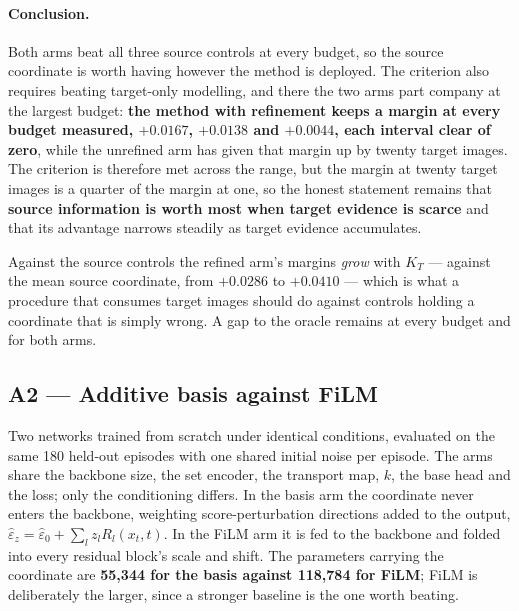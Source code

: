 \documentclass{article}
\begin{document}
\paragraph{Conclusion.} Both arms beat all three source controls at every budget, so the
source coordinate is worth having however the method is deployed. The criterion also
requires beating target-only modelling, and there the two arms part company at the largest
budget: \textbf{the method with refinement keeps a margin at every budget measured,
$+0.0167$, $+0.0138$ and $+0.0044$, each interval clear of zero}, while the unrefined arm
has given that margin up by twenty target images. The criterion is therefore met across the
range, but the margin at twenty target images is a quarter of the margin at one, so the
honest statement remains that \textbf{source information is worth most when target evidence
is scarce} and that its advantage narrows steadily as target evidence accumulates.

Against the source controls the refined arm's margins \emph{grow} with $K_T$ --- against the
mean source coordinate, from $+0.0286$ to $+0.0410$ --- which is what a procedure that
consumes target images should do against controls holding a coordinate that is simply wrong.
A gap to the oracle remains at every budget and for both arms.

\subsection{A2 --- Additive basis against FiLM}
\label{sec:a2}

Two networks trained from scratch under identical conditions, evaluated on the same 180
held-out episodes with one shared initial noise per episode. The arms share the backbone
size, the set encoder, the transport map, $k$, the base head and the loss; only the
conditioning differs. In the basis arm the coordinate never enters the backbone, weighting
score-perturbation directions added to the output,
$\hat\varepsilon_z = \hat\varepsilon_0 + \sum_l z_l R_l(x_t,t)$. In the FiLM arm it is fed to
the backbone and folded into every residual block's scale and shift. The parameters carrying
the coordinate are \textbf{55{,}344 for the basis against 118{,}784 for FiLM}; FiLM is
deliberately the larger, since a stronger baseline is the one worth beating.
\end{document}
